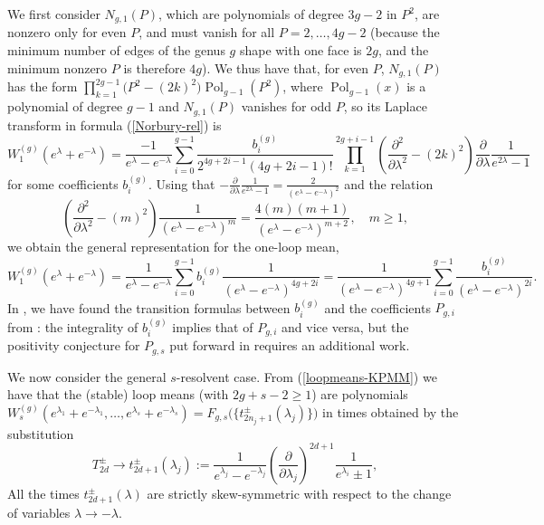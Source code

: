 \documentclass[11pt]{article}
\def\be{\begin{equation}}
\def\ee{\end{equation}}
\def\pa{\partial}
\def\beq{\begin{equation}}
\def\eeq{\end{equation}}
\theoremstyle{plain}
\theoremstyle{definition}
\def\beq{\begin{equation}}
\def\eeq{\end{equation}}
\begin{document}
We first consider $N_{g,1}(P)$, which are polynomials of degree $3g-2$ in $P^2$, are nonzero only for even $P$, and must vanish for all $P=2,\dots,4g-2$ (because the minimum number of edges of the genus $g$ shape with one face is $2g$, and
the minimum nonzero $P$ is therefore $4g$).
We thus have that, for even $P$, $N_{g,1}(P)$ has the form $\prod_{k=1}^{2g-1}\bigr(P^2-(2k)^2\bigl)\mathop{Pol}_{g-1}(P^2)$,
where $\mathop{Pol}_{g-1}(x)$ is a polynomial of degree $g-1$ and $N_{g,1}(P)$ vanishes for odd $P$, so
its Laplace transform in formula (\ref{Norbury-rel}) is
\beq
W_1^{(g)}(e^{\lambda}+e^{-\lambda})=\frac{-1}{e^{\lambda}-e^{-\lambda}}
\sum_{i=0}^{g-1}\frac{b_{i}^{(g)}}{2^{4g+2i-1}(4g+2i-1)!}
\prod_{k=1}^{2g+i-1}\left(\frac{\pa^{2}}{\pa \lambda^{2}}-(2k)^2\right)\frac{\pa}{\pa \lambda}\frac{1}{e^{2\lambda}-1}
\label{W1-1}
\eeq
for some coefficients $b_{i}^{(g)}$. 
Using that $-\frac{\pa}{\pa \lambda}\frac{1}{e^{2\lambda}-1}
=\frac{2}{(e^{\lambda}-e^{-\lambda})^2}$
and the relation
\beq
\left(\frac{\pa^{2}}{\pa \lambda^{2}}-(m)^2\right)\frac{1}{(e^{\lambda}-e^{-\lambda})^{m}}
=\frac{4(m)(m+1)}{(e^{\lambda}-e^{-\lambda})^{m+2}},\quad m\ge1,
\label{recursion1}
\eeq
we obtain the general representation for the one-loop mean,
\be
W_1^{(g)}(e^{\lambda}+e^{-\lambda})=\frac{1}{e^{\lambda}-e^{-\lambda}}
\sum_{i=0}^{g-1}b_{i}^{(g)}
\frac{1}{(e^{\lambda}-e^{-\lambda})^{4g+2i}}=\frac{1}{(e^{\lambda}-e^{-\lambda})^{4g+1}}
\sum_{i=0}^{g-1}\frac{b_{i}^{(g)}}{(e^{\lambda}-e^{-\lambda})^{2i}}.
\label{W1g-B}
\ee
In \cite{ACNP}, we have found the transition formulas between $b_{i}^{(g)}$ and the coefficients $P_{g,i}$ from
\cite{ACRPS}: the integrality of $b_{i}^{(g)}$ implies that of $P_{g,i}$ and vice versa, but the positivity conjecture for
$P_{g,s}$ put forward in \cite{ACRPS} requires an additional work.

We now consider the general $s$-resolvent case.
From (\ref{loopmeans-KPMM}) we have that
the (stable) loop means (with $2g+s-2\ge1$) are polynomials 
$W_s^{(g)}(e^{\lambda_1}+e^{-\lambda_1},\dots,e^{\lambda_s}+e^{-\lambda_s})
=F_{g,s}\bigl(\{t^{\pm}_{2n_j+1}(\lambda_{j})\}\bigr)$ in times obtained by the substitution 
\beq
\label{times}
T^{\pm}_{2d}\to t^{\pm}_{2d+1}(\lambda_{j}):=
\frac{1}{e^{\lambda_j}-e^{-\lambda_j}}
\left(\frac{\partial}{\partial \lambda_j}\right)^{2d+1}\frac{1}{e^{\lambda_i}\pm 1},
\eeq
All the times $t^{\pm}_{2d+1}(\lambda)$ are strictly
skew-symmetric with respect to the change of variables $\lambda\to -\lambda$.
\end{document}
